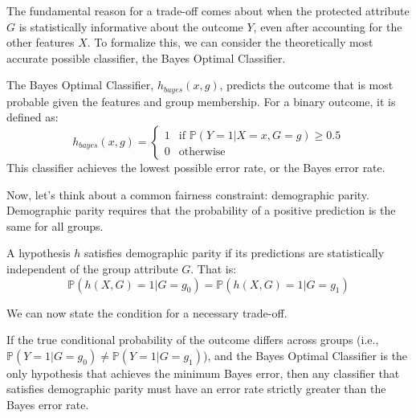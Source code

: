 The fundamental reason for a trade-off comes about when the protected attribute $G$ is statistically informative about the outcome $Y$, even after accounting for the other features $X$. To formalize this, we can consider the theoretically most accurate possible classifier, the Bayes Optimal Classifier.

\begin{definition}
The Bayes Optimal Classifier, $h_{bayes}(x, g)$, predicts the outcome that is most probable given the features and group membership. For a binary outcome, it is defined as:
\begin{equation}
h_{bayes}(x, g) = 
\begin{cases} 
1 & \text{if } \mathbb{P}(Y=1 | X=x, G=g) \geq 0.5 \\
0 & \text{otherwise}
\end{cases}
\end{equation}
This classifier achieves the lowest possible error rate, or the Bayes error rate.
\end{definition}

Now, let's think about a common fairness constraint: demographic parity. Demographic parity requires that the probability of a positive prediction is the same for all groups. 

\begin{definition}
A hypothesis $h$ satisfies demographic parity if its predictions are statistically independent of the group attribute $G$. That is:
\begin{equation}
    \mathbb{P}(h(X,G)=1 | G=g_0) = \mathbb{P}(h(X,G)=1 | G=g_1)
\end{equation}
\end{definition}

We can now state the condition for a necessary trade-off.

\begin{proposition}
If the true conditional probability of the outcome differs across groups (i.e., $\mathbb{P}(Y=1 | G=g_0) \neq \mathbb{P}(Y=1 | G=g_1)$), and the Bayes Optimal Classifier is the only hypothesis that achieves the minimum Bayes error, then any classifier that satisfies demographic parity must have an error rate strictly greater than the Bayes error rate.
\end{proposition}

